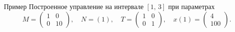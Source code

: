         \begin{frame}{Пример}
                Построенное управление на интервале $[1,\,3]$ при параметрах
                $$
                        M = \begin{pmatrix}
                1 & 0 \\
                0 & 10
                        \end{pmatrix},
                        \quad
                        N = (1),
                        \quad
                        T = \begin{pmatrix}
                1 & 0 \\
                0 & 1
                        \end{pmatrix},
                        \quad
                        x(1) = \begin{pmatrix}
                4 \\
                100
                        \end{pmatrix}.
                $$
        \end{frame}
